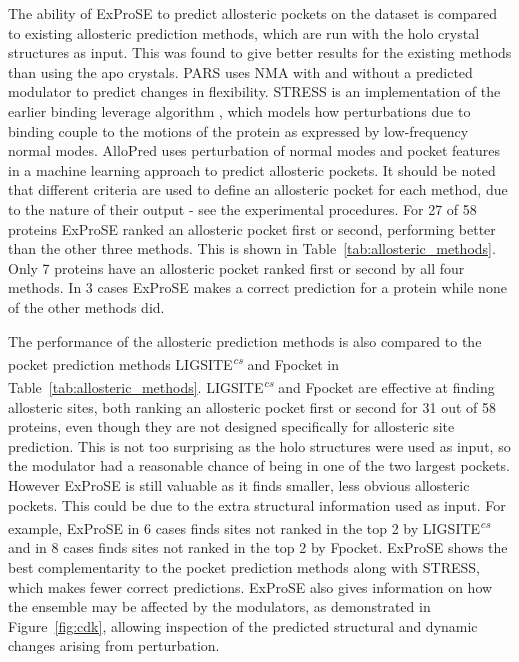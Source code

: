 The ability of ExProSE to predict allosteric pockets on the dataset is compared to existing allosteric prediction methods, which are run with the holo crystal structures as input.
This was found to give better results for the existing methods than using the apo crystals.
PARS \cite{Panjkovich2014} uses NMA with and without a predicted modulator to predict changes in flexibility.
STRESS \cite{Clarke2016} is an implementation of the earlier binding leverage algorithm \cite{Mitternacht2011}, which models how perturbations due to binding couple to the motions of the protein as expressed by low-frequency normal modes.
AlloPred \cite{Greener2015} uses perturbation of normal modes and pocket features in a machine learning approach to predict allosteric pockets.
It should be noted that different criteria are used to define an allosteric pocket for each method, due to the nature of their output - see the experimental procedures.
For 27 of 58 proteins ExProSE ranked an allosteric pocket first or second, performing better than the other three methods.
This is shown in Table~\ref{tab:allosteric_methods}.
Only 7 proteins have an allosteric pocket ranked first or second by all four methods.
In 3 cases ExProSE makes a correct prediction for a protein while none of the other methods did.

The performance of the allosteric prediction methods is also compared to the pocket prediction methods LIGSITE\textsuperscript{\it cs} and Fpocket \cite{LeGuilloux2009} in Table~\ref{tab:allosteric_methods}.
LIGSITE\textsuperscript{\it cs} and Fpocket are effective at finding allosteric sites, both ranking an allosteric pocket first or second for 31 out of 58 proteins, even though they are not designed specifically for allosteric site prediction.
This is not too surprising as the holo structures were used as input, so the modulator had a reasonable chance of being in one of the two largest pockets.
However ExProSE is still valuable as it finds smaller, less obvious allosteric pockets.
This could be due to the extra structural information used as input.
For example, ExProSE in 6 cases finds sites not ranked in the top 2 by LIGSITE\textsuperscript{\it cs} and in 8 cases finds sites not ranked in the top 2 by Fpocket.
ExProSE shows the best complementarity to the pocket prediction methods along with STRESS, which makes fewer correct predictions.
ExProSE also gives information on how the ensemble may be affected by the modulators, as demonstrated in Figure~\ref{fig:cdk}, allowing inspection of the predicted structural and dynamic changes arising from perturbation.

